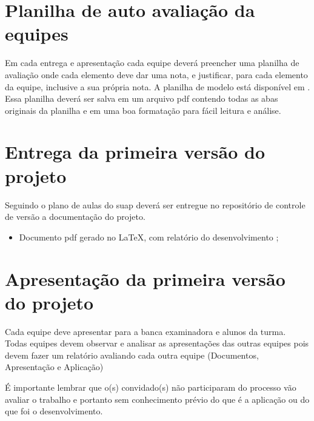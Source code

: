 \section{Planilha de auto avaliação da equipes}\label{atv-planilha-notas}
Em cada entrega e apresentação cada equipe deverá preencher uma planilha de avaliação onde cada elemento deve dar uma nota, e justificar, para cada elemento da equipe, inclusive a sua própria nota. A planilha de modelo está disponível em . Essa planilha deverá ser salva em um arquivo \ac{pdf} contendo todas as abas originais da planilha e em uma boa formatação para fácil leitura e análise.







\section{Entrega da primeira versão do projeto}\label{atv-primeira-versao}

Seguindo o plano de aulas do \ac{suap} deverá ser entregue no repositório de controle de versão a documentação do projeto.

\begin{itemize}
    \item Documento \ac{pdf} gerado no \LaTeX, com relatório do desenvolvimento ;
\end{itemize}

\section{Apresentação da primeira versão do projeto}\label{atv-apresentacao-primeira-versao}

Cada equipe deve apresentar para a banca examinadora e alunos da turma. Todas equipes devem observar e analisar as apresentações das outras equipes pois devem fazer um relatório avaliando cada outra equipe (Documentos, Apresentação e Aplicação) 

É importante lembrar que o(s) convidado(s) não participaram do processo vão avaliar o trabalho e portanto sem conhecimento prévio do que é a aplicação ou do que foi o desenvolvimento.

